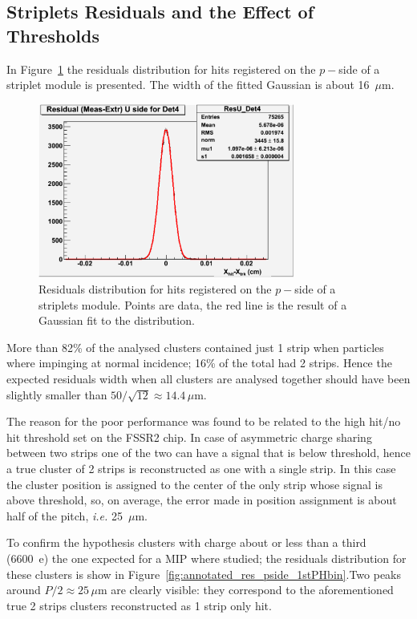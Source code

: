 \subsection{Striplets Residuals and the Effect of Thresholds}

In Figure~\ref{fig:res_pside} the residuals distribution for hits registered on the $p-$side of a striplet 
module is presented. The width of the fitted Gaussian is about 16~$\mu$m.

\begin{figure}[!htpb]
\centering
\includegraphics[width=0.75\textwidth]{res_pisde.pdf}
\caption{\label{fig:res_pside}Residuals distribution for hits registered on the $p-$side of a 
striplets module. Points are data, the red line is the result of a Gaussian fit to the distribution.}
\end{figure}

More than 82\% of the analysed clusters contained just 1 strip when particles where impinging 
at normal incidence; 16\% of the total had 2 strips. Hence the expected residuals width when all 
clusters are analysed together should have been slightly smaller than 
$50/\sqrt{12}\approx 14.4\, \mu$m. 

The reason for the poor performance was found to be related to the high hit/no hit threshold set 
on the FSSR2 chip. In case of asymmetric charge sharing between two strips one of the two 
can have a signal that is below threshold, hence a true cluster of 2 strips is reconstructed as one with 
 a single strip. In this case the cluster position is assigned to the center of the only strip whose signal is 
above threshold, so, on average, the error made in position assignment is about half of the pitch, 
{\it i.e.} 25~$\mu$m.

To confirm the hypothesis clusters with charge about or less than
 a third (6600~e) the one expected for a MIP where 
studied; the residuals distribution for these clusters is show in 
Figure~\ref{fig:annotated_res_pside_1stPHbin}.Two peaks around $P/2\approx25\,\mu$m are clearly visible: they correspond to the aforementioned true 2 strips clusters reconstructed as 1 strip only 
hit.


